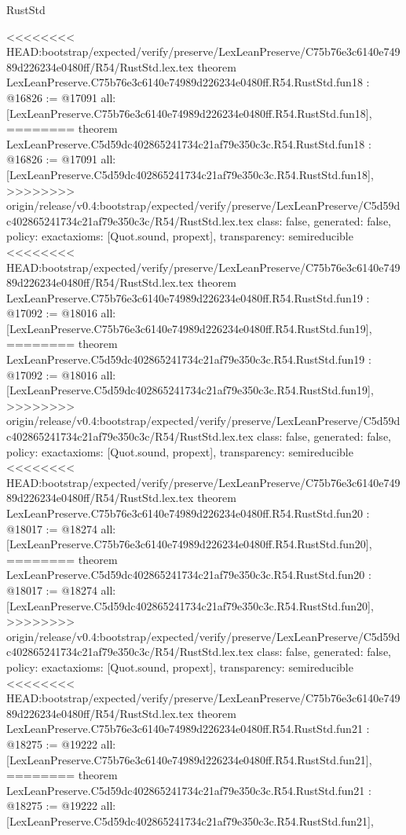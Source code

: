 \begin{lexlean}{RustStd}
\begin{coremodule}
{\begin{coremodule}
{{{{{{{{{{{{{{{{{{{{{}
<<<<<<<< HEAD:bootstrap/expected/verify/preserve/LexLeanPreserve/C75b76e3c6140e74989d226234e0480ff/R54/RustStd.lex.tex
theorem LexLeanPreserve.C75b76e3c6140e74989d226234e0480ff.R54.RustStd.fun18 : @16826 := @17091 {
  all: [LexLeanPreserve.C75b76e3c6140e74989d226234e0480ff.R54.RustStd.fun18],
========
theorem LexLeanPreserve.C5d59dc402865241734c21af79e350c3c.R54.RustStd.fun18 : @16826 := @17091 {
  all: [LexLeanPreserve.C5d59dc402865241734c21af79e350c3c.R54.RustStd.fun18],
>>>>>>>> origin/release/v0.4:bootstrap/expected/verify/preserve/LexLeanPreserve/C5d59dc402865241734c21af79e350c3c/R54/RustStd.lex.tex
  class: false,
  generated: false,
  policy: exact{axioms: [Quot.sound, propext]},
  transparency: semireducible
}
<<<<<<<< HEAD:bootstrap/expected/verify/preserve/LexLeanPreserve/C75b76e3c6140e74989d226234e0480ff/R54/RustStd.lex.tex
theorem LexLeanPreserve.C75b76e3c6140e74989d226234e0480ff.R54.RustStd.fun19 : @17092 := @18016 {
  all: [LexLeanPreserve.C75b76e3c6140e74989d226234e0480ff.R54.RustStd.fun19],
========
theorem LexLeanPreserve.C5d59dc402865241734c21af79e350c3c.R54.RustStd.fun19 : @17092 := @18016 {
  all: [LexLeanPreserve.C5d59dc402865241734c21af79e350c3c.R54.RustStd.fun19],
>>>>>>>> origin/release/v0.4:bootstrap/expected/verify/preserve/LexLeanPreserve/C5d59dc402865241734c21af79e350c3c/R54/RustStd.lex.tex
  class: false,
  generated: false,
  policy: exact{axioms: [Quot.sound, propext]},
  transparency: semireducible
}
<<<<<<<< HEAD:bootstrap/expected/verify/preserve/LexLeanPreserve/C75b76e3c6140e74989d226234e0480ff/R54/RustStd.lex.tex
theorem LexLeanPreserve.C75b76e3c6140e74989d226234e0480ff.R54.RustStd.fun20 : @18017 := @18274 {
  all: [LexLeanPreserve.C75b76e3c6140e74989d226234e0480ff.R54.RustStd.fun20],
========
theorem LexLeanPreserve.C5d59dc402865241734c21af79e350c3c.R54.RustStd.fun20 : @18017 := @18274 {
  all: [LexLeanPreserve.C5d59dc402865241734c21af79e350c3c.R54.RustStd.fun20],
>>>>>>>> origin/release/v0.4:bootstrap/expected/verify/preserve/LexLeanPreserve/C5d59dc402865241734c21af79e350c3c/R54/RustStd.lex.tex
  class: false,
  generated: false,
  policy: exact{axioms: [Quot.sound, propext]},
  transparency: semireducible
}
<<<<<<<< HEAD:bootstrap/expected/verify/preserve/LexLeanPreserve/C75b76e3c6140e74989d226234e0480ff/R54/RustStd.lex.tex
theorem LexLeanPreserve.C75b76e3c6140e74989d226234e0480ff.R54.RustStd.fun21 : @18275 := @19222 {
  all: [LexLeanPreserve.C75b76e3c6140e74989d226234e0480ff.R54.RustStd.fun21],
========
theorem LexLeanPreserve.C5d59dc402865241734c21af79e350c3c.R54.RustStd.fun21 : @18275 := @19222 {
  all: [LexLeanPreserve.C5d59dc402865241734c21af79e350c3c.R54.RustStd.fun21],
}}}}}}}}}}}}}}}}}}}}}}}}}
\end{coremodule}}
\end{coremodule}
\end{lexlean}
